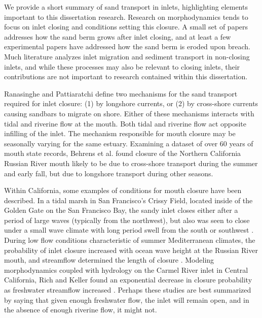 We provide a short summary of sand transport in inlets, highlighting elements important to this dissertation research. Research on morphodynamics tends to focus on inlet closing and conditions setting this closure. A small set of papers addresses how the sand berm grows after inlet closing, and at least a few experimental papers have addressed how the sand berm is eroded upon breach. Much literature analyzes inlet migration and sediment transport in non-closing inlets, and while these processes may also be relevant to closing inlets, their contributions are not important to research contained within this dissertation.

Ranasinghe and Pattiaratchi \parencite*{ranasinghe_seasonal_2003} define two mechanisms for the sand transport required for inlet closure: (1) by longshore currents, or (2) by cross-shore currents causing sandbars to migrate on shore. Either of these mechanisms interacts  with tidal and riverine flow at the mouth. Both tidal and riverine flow act opposite infilling of the inlet. The mechanism responsible for mouth closure may be seasonally varying for the same estuary. Examining a dataset of over 60 years of mouth state records, Behrens et al. \parencite*{behrens_episodic_2013} found closure of the Northern California Russian River mouth likely to be due to cross-shore transport during the summer and early fall, but due to longshore transport during other seasons.

Within California, some examples of conditions for mouth closure have been described. In a tidal marsh in San Francisco's Crissy Field, located inside of the Golden Gate on the San Francisco Bay, the sandy inlet closes either after a period of large waves (typically from the northwest), but also was seen to close under a small wave climate with long period swell from the south or southwest \parencite{hanes_waves_2011}. During low flow conditions characteristic of summer Mediterranean climates, the probability of inlet closure increased with ocean wave height at the Russian River mouth, and streamflow determined the length of closure \parencite{behrens_episodic_2013}. Modeling morphodynamics coupled with hydrology on the Carmel River inlet in Central California, Rich and Keller found an exponential decrease in closure probability as freshwater streamflow increased \parencite*{rich_hydrologic_2013}. Perhaps these studies are best summarized by saying that given enough freshwater flow, the inlet will remain open, and in the absence of enough riverine flow, it might not.

